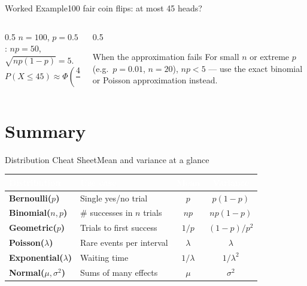 \documentclass[aspectratio=169,11pt]{beamer}
\begin{document}
\begin{frame}{Worked Example}{100 fair coin flips: at most 45 heads?}
  \begin{columns}[T]
    \begin{column}{0.5\textwidth}
      \small $n=100$, $p=0.5$: $np=50$, $\sqrt{np(1-p)}=5$.
      \footnotesize
      \[ P(X\le45) \approx \Phi\!\left(\frac{45.5-50}{5}\right) = \Phi(-0.9) \approx 0.184 \]
    \end{column}
    \begin{column}{0.5\textwidth}
      \begin{alertblock}{When the approximation fails}
        \small For small $n$ or extreme $p$ (e.g.\ $p=0.01$, $n=20$), $np<5$
        — use the exact binomial or Poisson approximation instead.
      \end{alertblock}
    \end{column}
  \end{columns}
\end{frame}

\section{Summary}

\begin{frame}{Distribution Cheat Sheet}{Mean and variance at a glance}
  \small
  \renewcommand{\arraystretch}{1.25}
  \begin{center}
  \begin{tabularx}{\textwidth}{@{}>{\bfseries}l >{\raggedright\arraybackslash}X cc@{}}
    \toprule
    \rowcolor{PrimaryDark}
    \textcolor{white}{Distribution} & \textcolor{white}{Use case} &
    \textcolor{white}{Mean} & \textcolor{white}{Variance} \\
    \midrule
    Bernoulli($p$) & Single yes/no trial & $p$ & $p(1-p)$ \\
    \rowcolor{PrimaryLight!25}
    Binomial($n,p$) & \# successes in $n$ trials & $np$ & $np(1-p)$ \\
    Geometric($p$) & Trials to first success & $1/p$ & $(1-p)/p^2$ \\
    \rowcolor{PrimaryLight!25}
    Poisson($\lambda$) & Rare events per interval & $\lambda$ & $\lambda$ \\
    Exponential($\lambda$) & Waiting time & $1/\lambda$ & $1/\lambda^2$ \\
    \rowcolor{PrimaryLight!25}
    Normal($\mu,\sigma^2$) & Sums of many effects & $\mu$ & $\sigma^2$ \\
    \bottomrule
  \end{tabularx}
  \end{center}
\end{frame}
\end{document}
